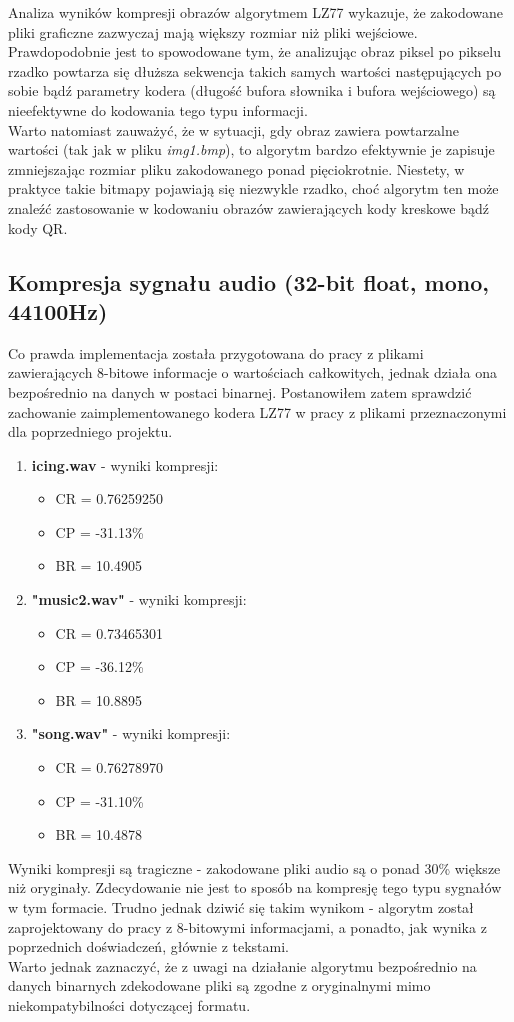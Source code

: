 \documentclass{article}
\begin{document}
Analiza wyników kompresji obrazów algorytmem LZ77 wykazuje, że zakodowane pliki graficzne zazwyczaj mają większy rozmiar niż pliki wejściowe. Prawdopodobnie jest to spowodowane tym, że analizując obraz piksel po pikselu rzadko powtarza się dłuższa sekwencja takich samych wartości następujących po sobie bądź parametry kodera (długość bufora słownika i bufora wejściowego) są nieefektywne do kodowania tego typu informacji.
\\Warto natomiast zauważyć, że w sytuacji, gdy obraz zawiera powtarzalne wartości (tak jak w pliku \textit{img1.bmp}), to algorytm bardzo efektywnie je zapisuje zmniejszając rozmiar pliku zakodowanego ponad pięciokrotnie. Niestety, w praktyce takie bitmapy pojawiają się niezwykle rzadko, choć algorytm ten może znaleźć zastosowanie w kodowaniu obrazów zawierających kody kreskowe bądź kody QR.
\subsection{Kompresja sygnału audio (32-bit float, mono, 44100Hz)}
Co prawda implementacja została przygotowana do pracy z plikami zawierających 8-bitowe informacje o wartościach całkowitych, jednak działa ona bezpośrednio na danych w postaci binarnej. Postanowiłem zatem sprawdzić zachowanie zaimplementowanego kodera LZ77 w pracy z plikami przeznaczonymi dla poprzedniego projektu.
\begin{enumerate}
\item \textbf{icing.wav} - wyniki kompresji:
    \begin{itemize}
        \item CR = 0.76259250
        \item CP = -31.13\%
        \item BR = 10.4905

    \end{itemize}
\item \textbf{"music2.wav"} - wyniki kompresji:
    \begin{itemize}
        \item CR = 0.73465301
        \item CP = -36.12\%
        \item BR = 10.8895
    \end{itemize}
\item \textbf{"song.wav"} - wyniki kompresji:
    \begin{itemize}
        \item CR = 0.76278970
        \item CP = -31.10\%
        \item BR = 10.4878
    \end{itemize}
\end{enumerate}
Wyniki kompresji są tragiczne - zakodowane pliki audio są o ponad 30\% większe niż oryginały. Zdecydowanie nie jest to sposób na kompresję tego typu sygnałów w tym formacie. Trudno jednak dziwić się takim wynikom - algorytm został zaprojektowany do pracy z 8-bitowymi informacjami, a ponadto, jak wynika z poprzednich doświadczeń, głównie z tekstami.
\\Warto jednak zaznaczyć, że z uwagi na działanie algorytmu bezpośrednio na danych binarnych zdekodowane pliki są zgodne z oryginalnymi mimo niekompatybilności dotyczącej formatu.
\end{document}
